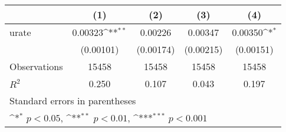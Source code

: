 {
\def\sym#1{\ifmmode^{#1}\else\(^{#1}\)\fi}
\begin{tabular}{l*{4}{c}}
\hline\hline
                    &\multicolumn{1}{c}{(1)}&\multicolumn{1}{c}{(2)}&\multicolumn{1}{c}{(3)}&\multicolumn{1}{c}{(4)}\\
\hline
urate               &     0.00323\sym{**} &     0.00226         &     0.00347         &     0.00350\sym{*}  \\
                    &   (0.00101)         &   (0.00174)         &   (0.00215)         &   (0.00151)         \\
\hline
Observations        &       15458         &       15458         &       15458         &       15458         \\
\(R^{2}\)           &       0.250         &       0.107         &       0.043         &       0.197         \\
\hline\hline
\multicolumn{5}{l}{\footnotesize Standard errors in parentheses}\\
\multicolumn{5}{l}{\footnotesize \sym{*} \(p<0.05\), \sym{**} \(p<0.01\), \sym{***} \(p<0.001\)}\\
\end{tabular}
}
